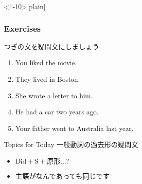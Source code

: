 \documentclass[aspectratio=169,xcolor={dvipsnames,table}]{beamer}
\newcommand{\myaudio}[1]{\href{#1}{\faVolumeUp}}
\begin{document}
\begin{frame}<1-10>[plain]\frametitle{Exercises}

つぎの文を疑問文にしましょう

 \begin{enumerate}
  \item<1-> You liked the movie.\hspace{59.7pt}
  \item<1-> They lived in Boston.\hspace{62pt}%
  \item<1-> She wrote a letter to him.\hspace{42pt}%
  \item<1-> He had  a car two years ago.\hspace{30.5pt}%
  \item<1-> Your father went to  Australia last year.\\
 \mbox{}\hfill{}
 \end{enumerate}

\begin{exampleblock}{Topics for Today}
\small
一般動詞の過去形の疑問文
\begin{itemize}[square]
 \item  \textcolor{NavyBlue}{\bfseries $\text{Did} + \text{S} + \text{原形} \ldots ?$}
 \item  主語がなんであっても同じです
\end{itemize}
      \end{exampleblock}

\vspace{-10pt}
\mbox{}\hfill\myaudio{./audio/027_past_did_you_04.mp3}


\end{frame}
\end{document}
